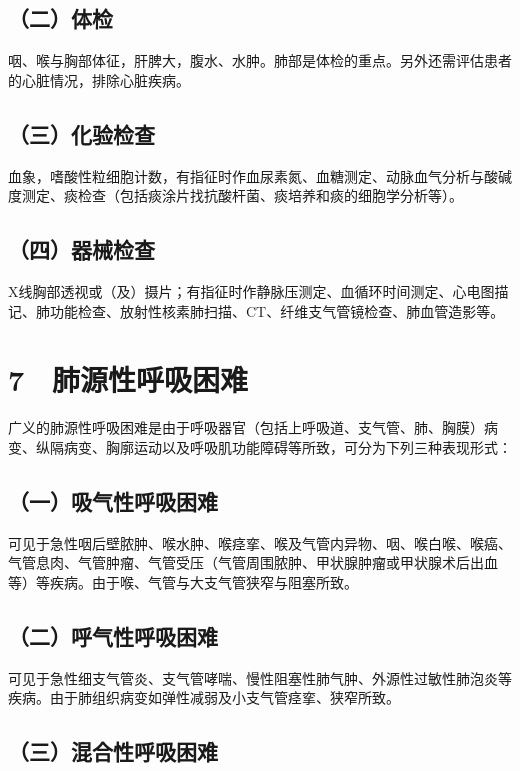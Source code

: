 \subsection{（二）体检}

咽、喉与胸部体征，肝脾大，腹水、水肿。肺部是体检的重点。另外还需评估患者的心脏情况，排除心脏疾病。

\subsection{（三）化验检查}

血象，嗜酸性粒细胞计数，有指征时作血尿素氮、血糖测定、动脉血气分析与酸碱度测定、痰检查（包括痰涂片找抗酸杆菌、痰培养和痰的细胞学分析等）。

\subsection{（四）器械检查}

X线胸部透视或（及）摄片；有指征时作静脉压测定、血循环时间测定、心电图描记、肺功能检查、放射性核素肺扫描、CT、纤维支气管镜检查、肺血管造影等。

\protect\hypertarget{text00044.html}{}{}

\section{7　肺源性呼吸困难}

广义的肺源性呼吸困难是由于呼吸器官（包括上呼吸道、支气管、肺、胸膜）病变、纵隔病变、胸廓运动以及呼吸肌功能障碍等所致，可分为下列三种表现形式：

\subsection{（一）吸气性呼吸困难}

可见于急性咽后壁脓肿、喉水肿、喉痉挛、喉及气管内异物、咽、喉白喉、喉癌、气管息肉、气管肿瘤、气管受压（气管周围脓肿、甲状腺肿瘤或甲状腺术后出血等）等疾病。由于喉、气管与大支气管狭窄与阻塞所致。

\subsection{（二）呼气性呼吸困难}

可见于急性细支气管炎、支气管哮喘、慢性阻塞性肺气肿、外源性过敏性肺泡炎等疾病。由于肺组织病变如弹性减弱及小支气管痉挛、狭窄所致。

\subsection{（三）混合性呼吸困难}

